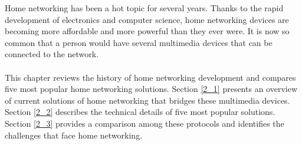 
Home networking has been a hot topic for several years. Thanks to the rapid development 
of electronics and computer science, home networking devices are becoming more affordable 
and more powerful than they ever were. It is now so common that a person would
have several multimedia devices that can be connected to the network. \\
\\
This chapter reviews the history of home networking development and compares five most popular home networking solutions. Section \ref{2_1} presents an overview of current solutions of home networking that bridges these multimedia devices. Section \ref{2_2} describes the technical details of five most popular solutions. Section \ref{2_3} provides a comparison among these protocols and identifies the challenges that face home networking.
